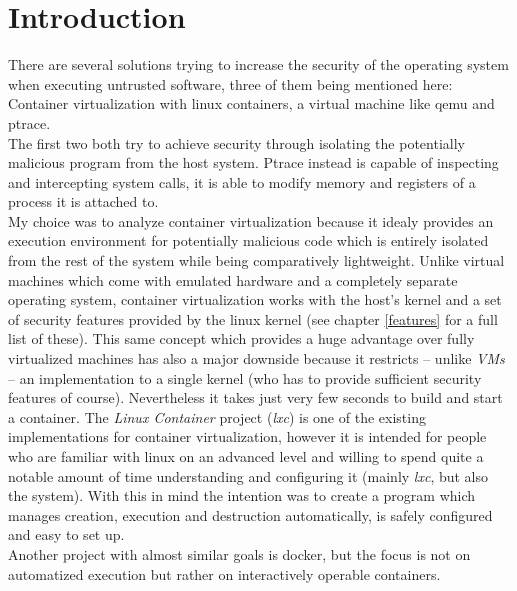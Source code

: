 \chapter{Introduction}

There are several solutions trying to increase the security of the operating system when executing untrusted software,
three of them being mentioned here:\\
Container virtualization with linux containers\cite{lxc}, a virtual machine like qemu\cite{qemu} and ptrace\cite{ptrace}.\\
The first two both try to achieve security through isolating the potentially malicious program from the host system.
Ptrace instead is capable of inspecting and intercepting system calls, it is able to modify memory and registers of a process it is attached to.\\
My choice was to analyze container virtualization because it idealy provides an execution environment for
potentially malicious code which is entirely isolated from the rest of the system while being comparatively
lightweight. Unlike virtual machines which come with emulated hardware and a completely separate operating
system, container virtualization works with the host's kernel and a set of security features provided by the
linux kernel (see chapter \ref{features} for a full list of these).
This same concept which provides a huge advantage over fully virtualized machines has also a major downside
because it restricts -- unlike  \textit{VMs} -- an implementation to a single kernel (who has to provide sufficient
security features of course). Nevertheless it takes just very few seconds to build and start a container.
The \textit{Linux Container} project (\textit{lxc}) is one of the existing implementations for container virtualization,
however it is intended for people who are familiar
with linux on an advanced level and willing to spend quite a notable amount of time understanding and
configuring it (mainly \textit{lxc}, but also the system). With this in mind the intention was to create a program
which manages creation, execution and destruction automatically, is safely configured and easy to set up.\\
Another project with almost similar goals is docker\cite{docker}, but the focus is not on automatized execution but rather on
interactively operable containers. 